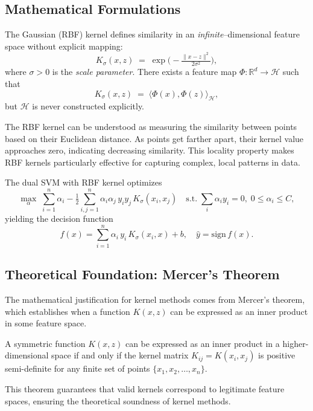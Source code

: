 \documentclass[11pt]{article}
\newenvironment{connection}
  {\begin{tcolorbox}[colback=green!5!white,colframe=green!75!black,title=Conceptual Connection]}
  {\end{tcolorbox}}
\begin{document}
\subsection{Mathematical Formulations}
The Gaussian (RBF) kernel defines similarity in an \emph{infinite}–dimensional feature space without explicit mapping:
\[
K_\sigma(x,z) \;=\;\exp\!\bigl(-\tfrac{\|x-z\|^2}{2\sigma^2}\bigr),
\]
where $\sigma>0$ is the \emph{scale parameter}.  There exists a feature map $\Phi: \mathbb{R}^d\to\mathcal{H}$ such that
\[
K_\sigma(x,z) \;=\;\langle \Phi(x),\Phi(z)\rangle_{\mathcal{H}},
\]
but $\mathcal{H}$ is never constructed explicitly.

\begin{connection}
The RBF kernel can be understood as measuring the similarity between points based on their Euclidean distance. As points get farther apart, their kernel value approaches zero, indicating decreasing similarity. This locality property makes RBF kernels particularly effective for capturing complex, local patterns in data.
\end{connection}

The dual SVM with RBF kernel optimizes
\[
\max_{\alpha}\;\sum_{i=1}^n \alpha_i
-\tfrac{1}{2}\sum_{i,j=1}^n\alpha_i\alpha_j\,y_i y_j\,K_\sigma(x_i,x_j)
\quad\text{s.t.}\;\sum_i \alpha_i y_i=0,\;0\le \alpha_i\le C,
\]
yielding the decision function
\[
f(x)=\sum_{i=1}^n \alpha_i\,y_i\,K_\sigma(x_i,x) + b,\quad
\hat y=\mathrm{sign}\,f(x).
\]

\subsection{Theoretical Foundation: Mercer's Theorem}
The mathematical justification for kernel methods comes from Mercer's theorem, which establishes when a function $K(x,z)$ can be expressed as an inner product in some feature space.

\begin{tcolorbox}[title=Mercer's Theorem (Simplified)]
A symmetric function $K(x,z)$ can be expressed as an inner product in a higher-dimensional space if and only if the kernel matrix $K_{ij} = K(x_i, x_j)$ is positive semi-definite for any finite set of points $\{x_1, x_2, \ldots, x_n\}$.
\end{tcolorbox}

This theorem guarantees that valid kernels correspond to legitimate feature spaces, ensuring the theoretical soundness of kernel methods.
\end{document}
